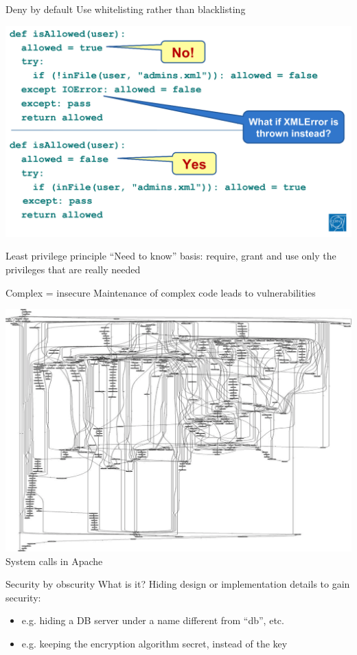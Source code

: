 \documentclass{beamer}
\begin{document}
\begin{frame}{{\color{red}Deny by default}}
Use whitelisting rather than blacklisting
\begin{center}
\includegraphics[width=0.8\linewidth]{whitelisting.png}
\end{center}
\end{frame}

\begin{frame}{Least privilege principle}
“Need to know” basis: require, grant and use only the privileges that are really needed
\end{frame}

\begin{frame}{Complex = insecure}
Maintenance of complex code leads to vulnerabilities
\begin{center}
\includegraphics[width=0.6\linewidth]{complex.png} \newline
System calls in Apache
\end{center}
\end{frame}

\begin{frame}{Security by obscurity}
What is it? Hiding design or implementation details to gain security:
\begin{itemize}
\item e.g. hiding a DB server under a name different from “db”, etc.
\item e.g. keeping the encryption algorithm secret, instead of the key
\end{itemize}
\end{frame}
\end{document}
